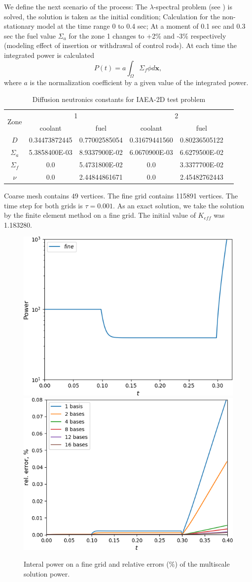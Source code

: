 \documentclass[runningheads]{llncs}
\begin{document}
We define the next scenario of the process: The $\lambda$-spectral problem (see \cite{Annals17}) is solved, the solution is taken as the initial condition; 
Calculation for the non-stationary model at the time range 0 to 0.4 sec;
At a moment of 0.1 sec and 0.3 sec the fuel value $\Sigma_a$ for the zone 1 changes to +2\% and -3\% respectively (modeling effect of insertion or withdrawal of control rods).
At each time the integrated power is calculated 
\[P(t) = a\int_{\Omega}\Sigma_f \phi d\bm x,\]
where $a$ is the normalization coefficient by a given value of the integrated power.

\begin{table}[h]
\caption{Diffusion neutronics constants for IAEA-2D test problem}
\label{t1}
\begin{center}
\begin{tabular}{|c|c|c|c|c|c|}
\hline
\multirow{2}{*}{Zone} & \multicolumn{2}{c|}{1} & \multicolumn{2}{c|}{2} \\
\cline{2-5}
& coolant & fuel & coolant & fuel \\
\hline
$D$ & 0.34473872445 & 0.77002585054 & 0.31679441560 & 0.80236505122 \\
$\Sigma_a$ & 5.3858400E-03 & 8.9337900E-02 & 6.0670900E-03 & 6.6279500E-02 \\
$\Sigma_{f}$ & 0.0 & 5.4731800E-02 & 0.0 & 3.3377700E-02 \\
$\nu$ & 0.0 & 2.44844861671 & 0.0 & 2.45482762443 \\
\hline
\end{tabular}
\end{center}
\end{table}

Coarse mesh contains $49$ vertices.
The fine grid contains 115891 vertices. 
The time step for both grids is $\tau = 0.001$.
As an exact solution, we take the solution by the finite element method on a fine grid.
The initial value of $K_{eff}$ was 1.183280. 

\begin{figure}[h!]
\centering
\includegraphics[width=0.45\linewidth]{power_fine.png} 
\hspace{2em}
\includegraphics[width=0.45\linewidth]{power.png} 
\caption{Interal power on a fine grid and relative errors ($\%$) of the multiscale solution power.}
\label{p4}
\end{figure}
 
\end{document}
